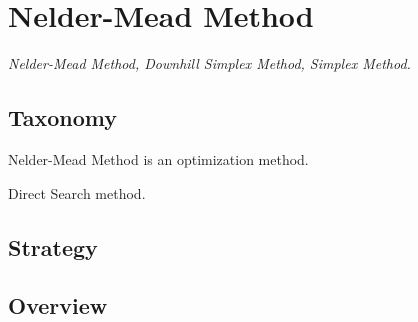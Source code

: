 
\section{Nelder-Mead Method} 
\label{sec:neldermead}

\emph{Nelder-Mead Method, Downhill Simplex Method, Simplex Method.}

\subsection{Taxonomy}
Nelder-Mead Method is an optimization method.

Direct Search method.

\subsection{Strategy}


\subsection{Overview}


